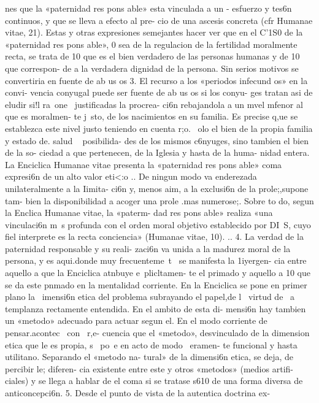 \documentclass[letterpaper]{report}
\begin{document}
nes que la «paternidad res pons able» esta vinculada a un - 
esfuerzo y tes6n continuos, y que se lleva a efecto al pre- 
cio de una ascesis concreta (cfr Humanae vitae, 21). Estas 
y otras expresiones semejantes hacer ver que en el C'1S0 
de la «paternidad res pons able», 0 sea de la regulacion de 
la fertilidad moralmente recta, se trata de 10 que es el bien 
verdadero de las personas humanas y de 10 que correspon- 
de a la verdadera dignidad de la persona. 
Sin serios motivos se convertiria en fuente de ab us os 
3. El recurso a los «periodos infecund os» en la convi- 
vencia conyugal puede ser fuente de ab us os si los conyu- 
ges tratan asi de eludir si!l ra~one~ justificadas la procrea- 
ci6n rebajandola a un mvel mfenor al que es moralmen- 
te j~sto, de los nacimientos en su familia. Es precise q,ue 
se establezca este nivel justo teniendo en cuenta r;o. ~olo 
el bien de la propia familia y estado de. salud ~ posibilida- 
des de los mismos c6nyuges, sino tambien el bien de la so- 
ciedad a que pertenecen, de la Iglesia y hasta de la huma- 
nidad entera. 
La Enciclica Humanae vitae presenta la «paternidad 
res pons able» coma expresi6n de un alto valor eti<:o .. De 
ningun modo va enderezada unilateralmente a la Iimita- 
ci6n y, menos aim, a la exclusi6n de la prole;,supone tam- 
bien la disponibilidad a acoger una prole .mas numerose;. 
Sobre to do, segun la Enclica Humanae vitae, la «paterm- 
dad res pons able» realiza «una vinculaci6n m~s profunda 
con el orden moral objetivo establecido por DI~S, cuyo fiel 
interprete es la recta conciencia» (Humanae vitae, 10). .. 
4. La verdad de la paternidad responsable y su reali- 
zaci6n va unida a la madurez moral de la persona, y es 
aqui.donde muy frecuenteme~t~ se manifesta la 1iyergen- 
cia entre aquello a que la Enciclica atnbuye e~plicltamen- 
te el primado y aquello a 10 que se da este pnmado en la 
mentalidad corriente. 
En la Enciclica se pone en primer plano la ~imensi6n 
etica del problema subrayando el papel,de l~ virtud de ~a 
templanza rectamente entendida. En el ambito de esta di- 
mensi6n hay tambien un «metodo» adecuado para actuar 
segun el. En el modo corriente de pensar.acontec~ con ~r,e- 
cuencia que el «metodo», desvinculado de la dimension 
etica que le es propia, s~ po~e en acto de modo ~eramen- 
te funcional y hasta utilitano. Separando el «metodo na- 
tural» de la dimensi6n etica, se deja, de percibir le; diferen- 
cia existente entre este y otros «metodos» (medios artifi- 
ciales) y se llega a hablar de el coma si se tratase s610 de 
una forma diversa de anticoncepci6n. 
5. Desde el punto de vista de la autentica doctrina ex- 
\end{document}
